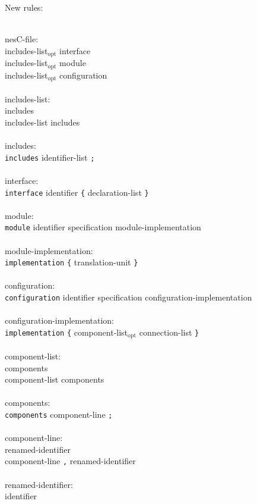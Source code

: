 \documentclass[11pt,letterpaper]{article}
\newcommand{\kw}[1]{{\tt #1}}
\newcommand{\opt}{$_{\mbox{opt}}$\xspace}
\newcommand{\grammarindent}{\hspace*{2cm}\= \\ \kill}
\begin{document}
New rules:
\em \begin{tabbing}
\grammarindent
nesC-file: \\
\>	includes-list\opt interface\\
\>	includes-list\opt module\\
\>	includes-list\opt configuration\\
\\
includes-list:\\
\>	includes\\
\>	includes-list includes\\
\\
includes:\\
\>	\kw{includes} identifier-list \kw{;}\\
\\
interface:\\
\>	\kw{interface} identifier \kw{\{} declaration-list \kw{\}}\\
\\
module:\\
\>	\kw{module} identifier specification module-implementation\\
\\
module-implementation:\\
\>	\kw{implementation} \kw{\{} translation-unit \kw{\}}\\
\\
configuration:\\
\>	\kw{configuration} identifier specification configuration-implementation\\
\\
configuration-implementation:\\
\>	\kw{implementation} \kw{\{} component-list\opt connection-list \kw{\}}\\
\\
component-list:\\
\>	components\\
\>	component-list components\\
\\
components:\\
\>	\kw{components} component-line \kw{;}\\
\\
component-line:\\
\>	renamed-identifier\\
\>	component-line \kw{,} renamed-identifier\\
\\
renamed-identifier:\\
\>	identifier\\

\end{tabbing}
\end{document}
